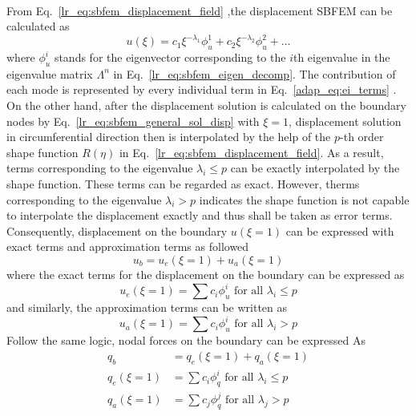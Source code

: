 \paragraph{}
From Eq.~\ref{lr_eq:sbfem_displacement_field} ,the displacement SBFEM can be calculated as
\begin{equation}
    u(\xi) = c_1 \xi ^{-\lambda_1} \phi_u^1
            +c_2 \xi ^{-\lambda_2} \phi_u^2
            +\dots
\label{adap_eq:ei_terms}
\end{equation}
where $\phi_u^i$ stands for the eigenvector corresponding to the $i$th eigenvalue in the eigenvalue matrix $\Lambda^{n}$ in Eq.~\ref{lr_eq:sbfem_eigen_decomp}.
The contribution of each mode is represented by every individual term in Eq.~\ref{adap_eq:ei_terms} \citep{Deeks2002}.
On the other hand, after the displacement solution is calculated on the boundary nodes by Eq.~\ref{lr_eq:sbfem_general_sol_disp} with $\xi=1$, displacement solution in circumferential direction then is interpolated by the help of the $p$-th order shape function $R(\eta)$ in Eq.~\ref{lr_eq:sbfem_displacement_field}.
As a result, terms corresponding to the eigenvalue $\lambda_i \leq p$ can be exactly interpolated by the shape function.
These terms can be regarded as exact.
However, therms corresponding to the eigenvalue $\lambda_i > p$ indicates the shape function is not capable to interpolate the displacement exactly and thus shall be taken as error terms.
Consequently, displacement on the boundary $u(\xi=1)$ can be expressed with exact terms and approximation terms as followed
\begin{equation}
    u_b = u_e (\xi=1) + u_a(\xi=1)
\end{equation}
where the exact terms for the displacement on the boundary can be expressed as
\begin{equation}
    u_e (\xi=1) = \sum c_i \phi_u^i \text{   for all  } \lambda_i \leq p
\end{equation}
and similarly, the approximation terms can be written as
\begin{equation}
    u_a (\xi=1) = \sum c_i \phi_u^i \text{   for all  } \lambda_i > p
\end{equation}
Follow the same logic, nodal forces on the boundary can be expressed As
\begin{equation}
    \begin{aligned}
        q_b &= q_e(\xi=1) + q_a(\xi=1) \\
        q_e(\xi=1) &= \sum c_i \phi_q^i \text{   for all  } \lambda_i \leq p \\
        q_a(\xi=1) &= \sum c_j \phi_q^j \text{   for all  } \lambda_j > p \\
    \end{aligned}
\end{equation}
